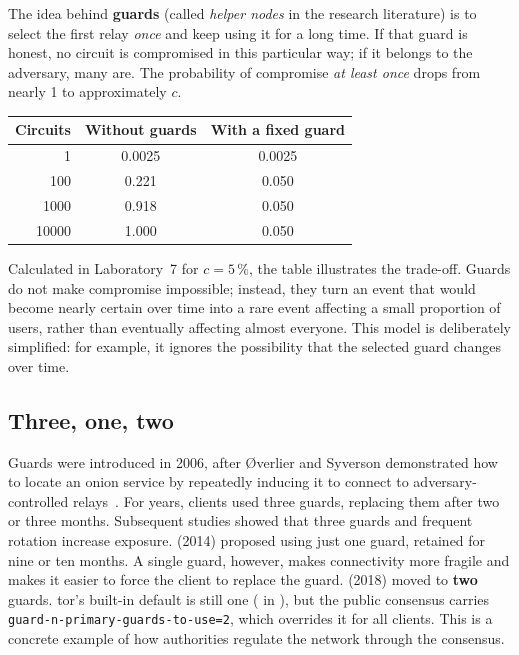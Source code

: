 The idea behind \textbf{guards} (called \emph{helper nodes} in the research literature) is to select the first relay \emph{once} and keep using it for a long time. If that guard is honest, no circuit is compromised in this particular way; if it belongs to the adversary, many are. The probability of compromise \emph{at least once} drops from nearly 1 to approximately $c$.

\begin{center}
\begin{tabular}{rcc}
\toprule
Circuits & Without guards & With a fixed guard \\
\midrule
1 & 0.0025 & 0.0025 \\
100 & 0.221 & 0.050 \\
\num{1000} & 0.918 & 0.050 \\
\num{10000} & 1.000 & 0.050 \\
\bottomrule
\end{tabular}
\end{center}
\noindent Calculated in Laboratory~7 for $c = 5\,\%$, the table illustrates the trade-off. Guards do not make compromise impossible; instead, they turn an event that would become nearly certain over time into a rare event affecting a small proportion of users, rather than eventually affecting almost everyone. This model is deliberately simplified: for example, it ignores the possibility that the selected guard changes over time.

\subsection{Three, one, two}

Guards were introduced in 2006, after Øverlier and Syverson demonstrated how to locate an onion service by repeatedly inducing it to connect to adversary-controlled relays~\cite{overlier2006locating}. For years, clients used three guards, replacing them after two or three months. Subsequent studies showed that three guards and frequent rotation increase exposure.  (2014) proposed using just one guard, retained for nine or ten months. A single guard, however, makes connectivity more fragile and makes it easier to force the client to replace the guard.  (2018) moved to \textbf{two} guards. tor's built-in default is still one ( in ), but the public consensus carries \texttt{guard-n-primary-guards-to-use=2}, which overrides it for all clients. This is a concrete example of how authorities regulate the network through the consensus.

